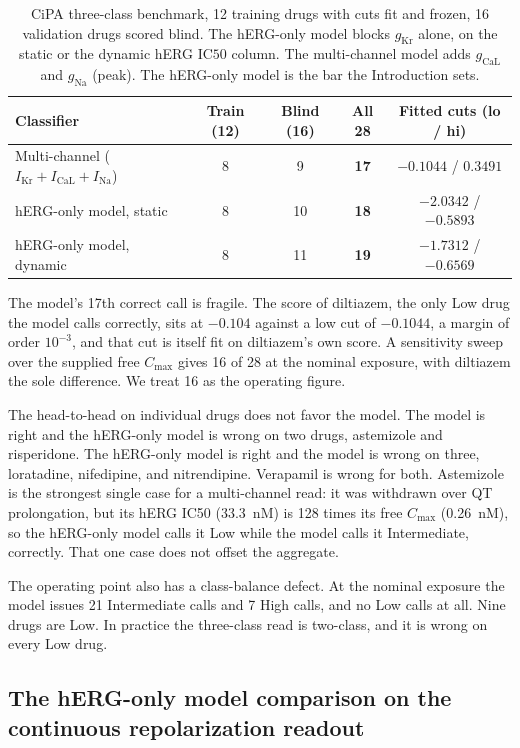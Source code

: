 \documentclass[preprint,12pt]{elsarticle}
\begin{document}
\begin{table}[!ht]
\centering
\caption{CiPA three-class benchmark, 12 training drugs with cuts fit and frozen, 16
validation drugs scored blind. The hERG-only model blocks $g_{\mathrm{Kr}}$ alone, on
the static or the dynamic hERG $\mathrm{IC50}$ column. The multi-channel model adds
$g_{\mathrm{CaL}}$ and $g_{\mathrm{Na}}$ (peak). The hERG-only model is the bar the Introduction
sets.}
\label{tab:benchmark}
\begin{tabular}{l c c c c}
\toprule
Classifier & Train (12) & Blind (16) & All 28 & Fitted cuts (lo / hi) \\
\midrule
Multi-channel ($I_{\mathrm{Kr}}+I_{\mathrm{CaL}}+I_{\mathrm{Na}}$) & 8 & 9 & \textbf{17} & $-0.1044$ / $0.3491$ \\
hERG-only model, static & 8 & 10 & \textbf{18} & $-2.0342$ / $-0.5893$ \\
hERG-only model, dynamic & 8 & 11 & \textbf{19} & $-1.7312$ / $-0.6569$ \\
\bottomrule
\end{tabular}
\end{table}

The model's 17th correct call is fragile. The score of diltiazem, the only Low drug the
model calls correctly, sits at $-0.104$ against a low cut of $-0.1044$, a margin of
order $10^{-3}$, and that cut is itself fit on diltiazem's own score. A sensitivity sweep
over the supplied free $C_{\mathrm{max}}$ gives 16 of 28 at the nominal exposure, with
diltiazem the sole difference. We treat 16 as the operating figure.

The head-to-head on individual drugs does not favor the model. The model is right and
the hERG-only model is wrong on two drugs, astemizole and risperidone. The hERG-only model is right and the
model is wrong on three, loratadine, nifedipine, and nitrendipine. Verapamil is wrong for
both. Astemizole is the strongest single case for a multi-channel read: it was withdrawn
over QT prolongation, but its hERG IC50 (33.3~nM) is 128 times its free
$C_{\mathrm{max}}$ (0.26~nM), so the hERG-only model calls it Low while the model calls it
Intermediate, correctly. That one case does not offset the aggregate.

The operating point also has a class-balance defect. At the nominal exposure the model
issues 21 Intermediate calls and 7 High calls, and no Low calls at all. Nine drugs are
Low. In practice the three-class read is two-class, and it is wrong on every Low drug.

\subsection{The hERG-only model comparison on the continuous repolarization readout}
\end{document}

